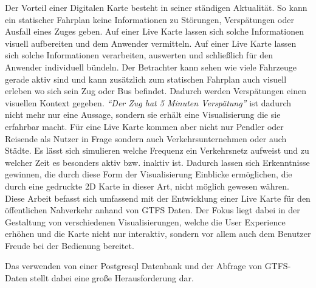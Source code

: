 \begin{newpage}
		Der Vorteil einer Digitalen Karte besteht in seiner ständigen Aktualität. So kann ein statischer Fahrplan keine Informationen zu Störungen, Verspätungen oder Ausfall eines Zuges geben. Auf einer Live Karte lassen sich solche Informationen visuell aufbereiten und dem Anwender vermitteln.
		Auf einer Live Karte lassen sich solche Informationen verarbeiten, auswerten und schließlich für den Anwender individuell bündeln. Der Betrachter kann sehen wie viele Fahrzeuge gerade aktiv sind und kann zusätzlich zum statischen Fahrplan auch visuell erleben wo sich sein Zug oder Bus befindet. Dadurch werden Verspätungen einen visuellen Kontext gegeben. \emph{"`Der Zug hat 5 Minuten Verspätung"'} ist dadurch nicht mehr nur eine Aussage, sondern sie erhält eine Visualisierung die sie erfahrbar macht.
    Für eine Live Karte kommen aber nicht nur Pendler oder Reisende als Nutzer in Frage sondern auch Verkehrsunternehmen oder auch Städte.
    Es lässt sich simulieren welche Frequenz ein Verkehrsnetz aufweist und zu welcher Zeit es besonders aktiv bzw. inaktiv ist. 
		Dadurch lassen sich Erkenntnisse gewinnen, die durch diese Form der Visualisierung Einblicke ermöglichen, die durch eine gedruckte 2D Karte in dieser Art, nicht möglich gewesen währen.\\

		Diese Arbeit befasst sich umfassend mit der Entwicklung einer Live Karte für den öffentlichen Nahverkehr anhand von GTFS Daten. Der Fokus liegt dabei in der Gestaltung von verschiedenen Visualisierungen, welche die User Experience erhöhen und die Karte nicht nur interaktiv, sondern vor allem auch dem Benutzer Freude bei der Bedienung bereitet.
		
		Das verwenden von einer Postgresql Datenbank und der Abfrage von GTFS-Daten stellt dabei eine große Herausforderung dar.





\end{newpage}
